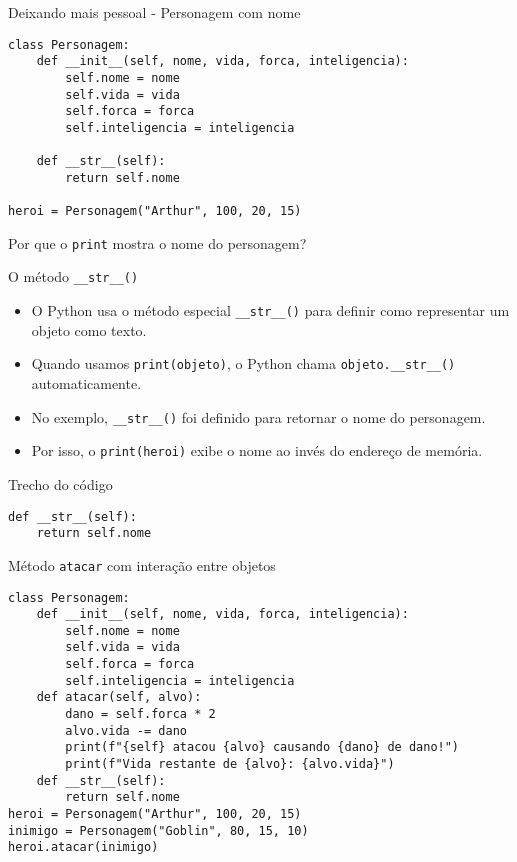 \begin{frame}[fragile]{Deixando mais pessoal - Personagem com nome}

\begin{verbatim}
class Personagem:
    def __init__(self, nome, vida, forca, inteligencia):
        self.nome = nome
        self.vida = vida
        self.forca = forca
        self.inteligencia = inteligencia

    def __str__(self):
        return self.nome

heroi = Personagem("Arthur", 100, 20, 15)
\end{verbatim}

\end{frame}

\begin{frame}[fragile]{Por que o \texttt{print} mostra o nome do personagem?}

\begin{block}{O método \texttt{\_\_str\_\_()}}
\begin{itemize}
    \item O Python usa o método especial \texttt{\_\_str\_\_()} para definir como representar um objeto como texto.
    \item Quando usamos \texttt{print(objeto)}, o Python chama \texttt{objeto.\_\_str\_\_()} automaticamente.
    \item No exemplo, \texttt{\_\_str\_\_()} foi definido para retornar o nome do personagem.
    \item Por isso, o \texttt{print(heroi)} exibe o nome ao invés do endereço de memória.
\end{itemize}
\end{block}

\begin{exampleblock}{Trecho do código}
\begin{verbatim}
def __str__(self):
    return self.nome
\end{verbatim}
\end{exampleblock}

\end{frame}

\begin{frame}[fragile]{Método \texttt{atacar} com interação entre objetos}

\begin{verbatim}
class Personagem:
    def __init__(self, nome, vida, forca, inteligencia):
        self.nome = nome
        self.vida = vida
        self.forca = forca
        self.inteligencia = inteligencia
    def atacar(self, alvo):
        dano = self.forca * 2
        alvo.vida -= dano
        print(f"{self} atacou {alvo} causando {dano} de dano!")
        print(f"Vida restante de {alvo}: {alvo.vida}")
    def __str__(self):
        return self.nome
heroi = Personagem("Arthur", 100, 20, 15)
inimigo = Personagem("Goblin", 80, 15, 10)
heroi.atacar(inimigo)
\end{verbatim}

\end{frame}

